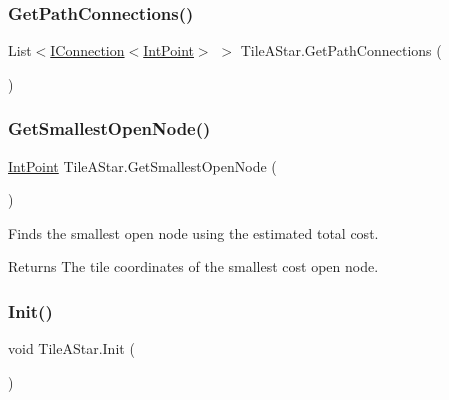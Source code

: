 \subsubsection{\texorpdfstring{Get\+Path\+Connections()}{GetPathConnections()}}
{\footnotesize\ttfamily List$<$\mbox{\hyperlink{interface_i_connection}{I\+Connection}}$<$\mbox{\hyperlink{struct_int_point}{Int\+Point}}$>$ $>$ Tile\+A\+Star.\+Get\+Path\+Connections (\begin{DoxyParamCaption}{ }\end{DoxyParamCaption})}

\mbox{\label{class_tile_a_star_aaf9df73761ac2b7010ec6f85c3cc1b41}} 
\subsubsection{\texorpdfstring{Get\+Smallest\+Open\+Node()}{GetSmallestOpenNode()}}
{\footnotesize\ttfamily \mbox{\hyperlink{struct_int_point}{Int\+Point}} Tile\+A\+Star.\+Get\+Smallest\+Open\+Node (\begin{DoxyParamCaption}{ }\end{DoxyParamCaption})}



Finds the smallest open node using the estimated total cost. 

\begin{DoxyReturn}{Returns}
The tile coordinates of the smallest cost open node. 
\end{DoxyReturn}
\mbox{\label{class_tile_a_star_ae6c2de8ee7160c0d91a28186671717a9}} 
\subsubsection{\texorpdfstring{Init()}{Init()}}
{\footnotesize\ttfamily void Tile\+A\+Star.\+Init (\begin{DoxyParamCaption}{ }\end{DoxyParamCaption})}

\mbox{\label{class_tile_a_star_af74b5cf47adcbb877850cc5879a94b76}} 
